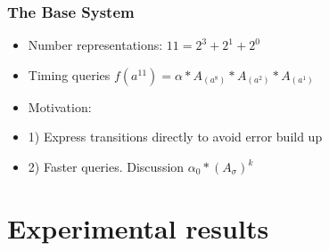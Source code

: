 \documentclass{beamer}
\begin{document}
\begin{frame}
\frametitle{The Base System}
\begin{itemize}

\item Number representations: $11 = 2^3 + 2^1 + 2^0$

\item Timing queries $f(a^11) = \alpha*A_(a^8)*A_(a^2)*A_(a^1)$

\item Motivation: 
\item[] 1) Express transitions directly to avoid error build up
\item[] 2) Faster queries. Discussion $\alpha_0*(A_\sigma)^k$
\end{itemize}
\end{frame}

\section{Experimental results}
\end{document}

